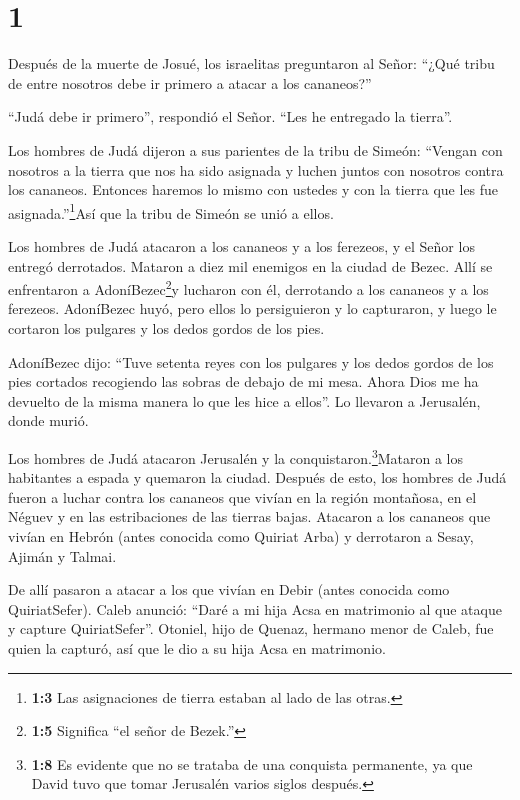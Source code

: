 \hypertarget{section}{%
\section{1}\label{section}}

 Después de la muerte de Josué, los israelitas preguntaron
al Señor: ``¿Qué tribu de entre nosotros debe ir primero a atacar a los
cananeos?''

 ``Judá debe ir primero'', respondió el Señor. ``Les he
entregado la tierra''.

 Los hombres de Judá dijeron a sus parientes de la tribu de
Simeón: ``Vengan con nosotros a la tierra que nos ha sido asignada y
luchen juntos con nosotros contra los cananeos. Entonces haremos lo
mismo con ustedes y con la tierra que les fue asignada.''\footnote{\textbf{1:3}
  Las asignaciones de tierra estaban al lado de las otras.}Así que la
tribu de Simeón se unió a ellos.

 Los hombres de Judá atacaron a los cananeos y a los
ferezeos, y el Señor los entregó derrotados. Mataron a diez mil enemigos
en la ciudad de Bezec.  Allí se enfrentaron a
AdoníBezec\footnote{\textbf{1:5} Significa ``el señor de Bezek.''}y
lucharon con él, derrotando a los cananeos y a los ferezeos.
 AdoníBezec huyó, pero ellos lo persiguieron y lo
capturaron, y luego le cortaron los pulgares y los dedos gordos de los
pies.

 AdoníBezec dijo: ``Tuve setenta reyes con los pulgares y
los dedos gordos de los pies cortados recogiendo las sobras de debajo de
mi mesa. Ahora Dios me ha devuelto de la misma manera lo que les hice a
ellos''. Lo llevaron a Jerusalén, donde murió.

 Los hombres de Judá atacaron Jerusalén y la
conquistaron.\footnote{\textbf{1:8} Es evidente que no se trataba de una
  conquista permanente, ya que David tuvo que tomar Jerusalén varios
  siglos después.}Mataron a los habitantes a espada y quemaron la
ciudad.  Después de esto, los hombres de Judá fueron a
luchar contra los cananeos que vivían en la región montañosa, en el
Néguev y en las estribaciones de las tierras bajas. 
Atacaron a los cananeos que vivían en Hebrón (antes conocida como
Quiriat Arba) y derrotaron a Sesay, Ajimán y Talmai.

 De allí pasaron a atacar a los que vivían en Debir (antes
conocida como QuiriatSefer).  Caleb anunció: ``Daré a mi
hija Acsa en matrimonio al que ataque y capture QuiriatSefer''.
 Otoniel, hijo de Quenaz, hermano menor de Caleb, fue quien
la capturó, así que le dio a su hija Acsa en matrimonio.

